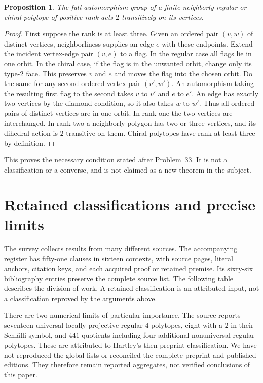 \documentclass[11pt,a4paper]{article}
\newtheorem{proposition}[theorem]{Proposition}
\begin{document}
\begin{proposition}\label{neighborly}
The full automorphism group of a finite neighborly regular
or chiral polytope of positive rank acts $2$-transitively on its vertices.
\end{proposition}
\begin{proof}
First suppose the rank is at least three. Given an ordered
pair $(v,w)$ of distinct vertices, neighborliness supplies
an edge $e$ with these endpoints. Extend the incident
vertex-edge pair $(v,e)$ to a flag. In the regular case
all flags lie in one orbit. In the chiral case, if the flag
is in the unwanted orbit, change only its type-$2$ face.
This preserves $v$ and $e$ and moves the flag into the
chosen orbit. Do the same for any second ordered vertex
pair $(v',w')$. An automorphism taking the resulting first
flag to the second takes $v$ to $v'$ and $e$ to $e'$.
An edge has exactly two vertices by the diamond condition,
so it also takes $w$ to $w'$. Thus all ordered pairs of
distinct vertices are in one orbit. In rank one the two
vertices are interchanged. In rank two a neighborly
polygon has two or three vertices, and its dihedral
action is $2$-transitive on them. Chiral polytopes have
rank at least three by definition.
\end{proof}
This proves the necessary condition stated after Problem~33.
It is not a classification or a converse, and is not
claimed as a new theorem in the subject.

\section{Retained classifications and precise limits}

The survey collects results from many different sources.
The accompanying register has fifty-one clauses in sixteen
contexts, with source pages, literal anchors, citation keys,
and each acquired proof or retained premise. Its sixty-six
bibliography entries preserve the complete source list.
The following table describes the division of work. A
retained classification is an attributed input, not a
classification reproved by the arguments above.



There are two numerical limits of particular importance.
The source reports seventeen universal locally projective
regular $4$-polytopes, eight with a $2$ in their Schl\"afli
symbol, and $441$ quotients including four additional
nonuniversal regular polytopes. These are attributed to
Hartley's then-preprint classification. We have not
reproduced the global lists or reconciled the complete
preprint and published editions. They therefore remain
reported aggregates, not verified conclusions of this paper.
\end{document}

